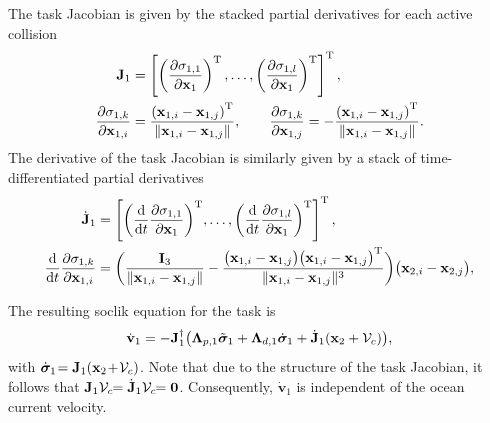 The task Jacobian is given by the stacked partial derivatives for each active collision
\begin{subequations}
\begin{align}
    \mathbf{J}_1 &= \left[\left(\frac{\partial \sigma_{1,1}}{\partial \mathbf{x}_1}\right)^{\mathrm{T}}, \ldots, \left(\frac{\partial \sigma_{1,l}}{\partial \mathbf{x}_1}\right)^{\mathrm{T}}\right]^{\mathrm{T}},\\
    \frac{\partial \sigma_{1,k}}{\partial \mathbf{x}_{1,i}} &=\frac{\left(\mathbf{x}_{1,i}-\mathbf{x}_{1,j}\right) ^{\mathrm{T}}}{\|\mathbf{x}_{1,i} - \mathbf{x}_{1,j}\|}, \qquad
    \frac{\partial \sigma_{1,k}}{\partial \mathbf{x}_{1,j}} = -\frac{\left(\mathbf{x}_{1,i}-\mathbf{x}_{1,j}\right) ^{\mathrm{T}}}{\|\mathbf{x}_{1,i} - \mathbf{x}_{1,j}\|}.
\end{align}
\end{subequations}
The derivative of the task Jacobian is similarly given by a stack of time-differentiated partial derivatives
\begin{subequations}
\begin{align}
    \dot{\mathbf{J}}_1 &= \left[{\left(\frac{{\rm d}}{{\rm d}t}\frac{\partial \sigma_{1,1}}{\partial \mathbf{x}_1}\right)}^{\mathrm{T}}, \ldots, {\left(\frac{{\rm d}}{{\rm d}t}\frac{\partial \sigma_{1,l}}{\partial \mathbf{x}_1}\right)}^{\mathrm{T}}\right]^{\mathrm{T}},\\
    {\frac{{\rm d}}{{\rm d}t}\frac{\partial \sigma_{1,k}}{\partial \mathbf{x}_{1,i}}} &= \bigg(\frac{\mathbf{I}_3}{\|\mathbf{x}_{1,i} - \mathbf{x}_{1,j}\|} - \frac{\bigl(\mathbf{x}_{1,i}-\mathbf{x}_{1,j}\bigr)\bigl(\mathbf{x}_{1,i}-\mathbf{x}_{1,j}\bigr)^{\mathrm{T}}}{\|\mathbf{x}_{1,i} - \mathbf{x}_{1,j}\|^3}\bigg)\bigl(\mathbf{x}_{2,i}-\mathbf{x}_{2,j}\bigr),
\end{align}
\end{subequations}

The resulting \gls{soclik} equation for the task is
\begin{equation}
    \dot{\mathbf{v}}_1 = -\mathbf{J}_1^\dagger \bigl( \mathbf{\Lambda}_{p,1}\Tilde{\bm{\sigma}}_1 + \mathbf{\Lambda}_{d,1} \dot{\bm{\sigma}}_1 + \dot{\mathbf{J}}_1 (\mathbf{x}_2+\mathcal{V}_c)\bigr),
\end{equation}
with $\dot{\bm{\sigma}}_{1\,} \!\!= \mathbf{J}_1 (\mathbf{x}_2\! + \!\mathcal{V}_c)$. %
Note that due to the structure of the task Jacobian, it follows that $\mathbf{J}_1 \mathcal{V}_c \!\!= \dot{\mathbf{J}}_1 \mathcal{V}_c \!\!= \mathbf{0}$. Consequently, $\dot{\mathbf{v}}_1$ is independent of the ocean current velocity.

